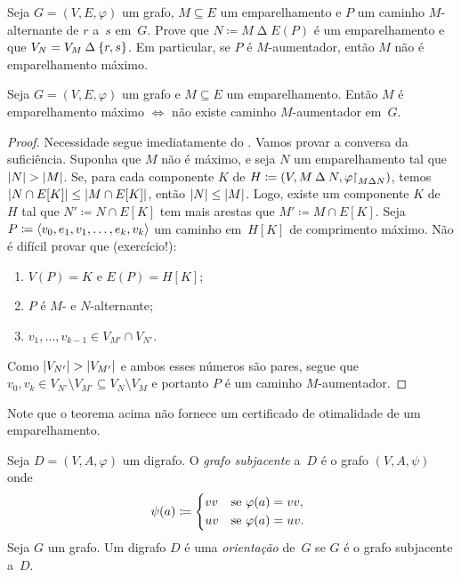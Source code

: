 \documentclass[10pt,reqno]{amsart}
\begin{document}
\begin{exercise}
  \label{ex:6}
  Seja \(G = (V,E,\varphi)\) um grafo, \(M \subseteq E\) um
  emparelhamento e \(P\) um caminho \(M\)-alternante de \(r\) a~\(s\)
  em~\(G\).  Prove que \(N \coloneqq M \mathbin{\Delta} E(P)\) é um
  emparelhamento e que \(V_N = V_M \mathbin{\Delta} \{r,s\}\).  Em
  particular, se \(P\) é \(M\)-aumentador, então \(M\) não é
  emparelhamento máximo.
\end{exercise}

\begin{theorem}
  Seja \(G = (V,E,\varphi)\) um grafo e \(M \subseteq E\) um
  emparelhamento.  Então \(M\) é emparelhamento máximo \(\iff\) não
  existe caminho \(M\)-aumentador em~\(G\).
\end{theorem}
\begin{proof}
  Necessidade segue imediatamente do .  Vamos provar a
  conversa da suficiência.  Suponha que \(M\) não é máximo, e seja
  \(N\) um emparelhamento tal que \(\lvert N\rvert > \lvert M\rvert\).  Se, para
  cada componente \(K\) de
  \(H \coloneqq (V, M \mathbin{\Delta} N, \varphi\mathord{\restriction}_{M
    \mathbin{\Delta} N})\), temos
  \(\lvert N \cap E[K]\rvert \leq \lvert M \cap E[K]\rvert\), então
  \(\lvert N\rvert \leq \lvert M\rvert\).  Logo, existe um componente \(K\)
  de~\(H\) tal que \(N' \coloneqq N \cap E[K]\) tem mais arestas que
  \(M' \coloneqq M \cap E[K]\).  Seja
  \(P \coloneqq \langle v_0,e_1,v_1,\dotsc,e_k,v_k\rangle\) um caminho
  em~\(H[K]\) de comprimento máximo.  Não é difícil provar que
  (exercício!):
  \begin{enumerate}
  \item \(V(P) = K\) e \(E(P) = H[K]\);
  \item \(P\) é \(M\)- e \(N\)-alternante;
  \item \(v_1,\dotsc,v_{k-1} \in V_{M'} \cap V_{N'}\).
  \end{enumerate}
  Como
  \(\lvert V_{N'}\rvert > \lvert V_{M'}\rvert\) e ambos esses números são pares,
  segue que \(v_0,v_k \in V_{N'} \setminus V_{M'} \subseteq V_N
  \setminus V_M\) e portanto \(P\) é um caminho \(M\)-aumentador.
\end{proof}

Note que o teorema acima não fornece um certificado de otimalidade de
um emparelhamento.

Seja \(D = (V,A,\varphi)\) um digrafo.  O \emph{grafo subjacente}
a~\(D\) é o grafo \((V,A,\psi)\) onde
\begin{equation*}
  \psi(a)
  \coloneqq
  \begin{cases*}
    vv
    &
    se \(\varphi(a) = vv\),
    \\
    uv
    &
    se \(\varphi(a) = uv\).
  \end{cases*}
\end{equation*}
Seja \(G\) um grafo.  Um digrafo \(D\) é uma \emph{orientação}
de~\(G\) se \(G\) é o grafo subjacente a~\(D\).
\end{document}
